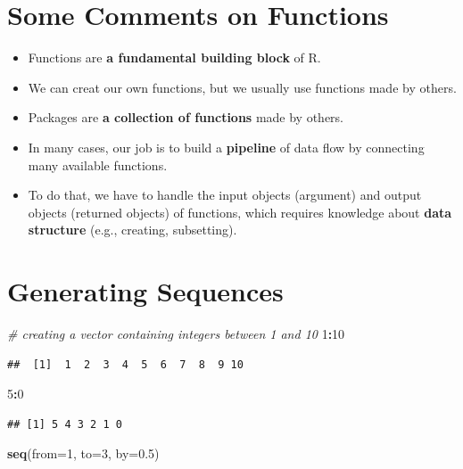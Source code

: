 \documentclass[]{book}
\newenvironment{Shaded}{\begin{snugshade}}{\end{snugshade}}
\newcommand{\CommentTok}[1]{\textcolor[rgb]{0.56,0.35,0.01}{\textit{#1}}}
\newcommand{\DataTypeTok}[1]{\textcolor[rgb]{0.13,0.29,0.53}{#1}}
\newcommand{\DecValTok}[1]{\textcolor[rgb]{0.00,0.00,0.81}{#1}}
\newcommand{\FloatTok}[1]{\textcolor[rgb]{0.00,0.00,0.81}{#1}}
\newcommand{\KeywordTok}[1]{\textcolor[rgb]{0.13,0.29,0.53}{\textbf{#1}}}
\newcommand{\NormalTok}[1]{#1}
\newcommand{\OperatorTok}[1]{\textcolor[rgb]{0.81,0.36,0.00}{\textbf{#1}}}
\providecommand{\tightlist}{%
  \setlength{\itemsep}{0pt}\setlength{\parskip}{0pt}}
\begin{document}
\hypertarget{some-comments-on-functions}{%
\section{Some Comments on Functions}\label{some-comments-on-functions}}

\begin{itemize}
\tightlist
\item
  Functions are \textbf{a fundamental building block} of R.
\item
  We can creat our own functions, but we usually use functions made by others.
\item
  Packages are \textbf{a collection of functions} made by others.
\item
  In many cases, our job is to build a \textbf{pipeline} of data flow by connecting many available functions.
\item
  To do that, we have to handle the input objects (argument) and output objects (returned objects) of functions, which requires knowledge about \textbf{data structure} (e.g., creating, subsetting).
\end{itemize}

\hypertarget{generating-sequences}{%
\section{Generating Sequences}\label{generating-sequences}}

\begin{Shaded}
\begin{Highlighting}[]
\CommentTok{# creating a vector containing integers between 1 and 10}
\DecValTok{1}\OperatorTok{:}\DecValTok{10} 
\end{Highlighting}
\end{Shaded}

\begin{verbatim}
##  [1]  1  2  3  4  5  6  7  8  9 10
\end{verbatim}

\begin{Shaded}
\begin{Highlighting}[]
\DecValTok{5}\OperatorTok{:}\DecValTok{0}
\end{Highlighting}
\end{Shaded}

\begin{verbatim}
## [1] 5 4 3 2 1 0
\end{verbatim}

\begin{Shaded}
\begin{Highlighting}[]
\KeywordTok{seq}\NormalTok{(}\DataTypeTok{from=}\DecValTok{1}\NormalTok{, }\DataTypeTok{to=}\DecValTok{3}\NormalTok{, }\DataTypeTok{by=}\FloatTok{0.5}\NormalTok{)}
\end{Highlighting}
\end{Shaded}
\end{document}
